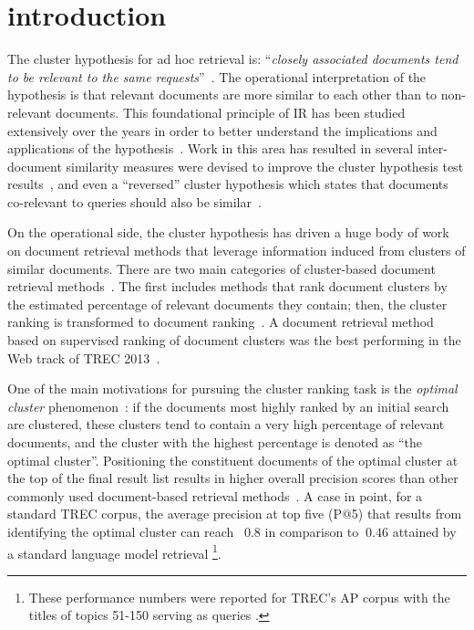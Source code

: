 \section{introduction}
\label{sec:intro}

The cluster hypothesis for ad hoc retrieval is: ``{\em closely
associated documents tend to be relevant to the same
requests}''~{\cite{Jardine+Rijsbergen:71a}}.
The operational interpretation of the hypothesis is that relevant
documents are more similar to each other than to non-relevant
documents.
This foundational principle of IR has been studied extensively over
the years in order to better understand the implications and
applications of the
hypothesis~{\cite{Jardine+Rijsbergen:71a,Voorhees:85a,elHamdouchi+Willett:87a,Crestani+Wu:06a,Smucker+Allan:09a,Raiber+Kurland:14c}}.
Work in this area has resulted in several inter-document similarity
measures were devised to improve the cluster hypothesis test
results~\cite{Tombros+Villa+Rijsbergen:02a,Raiber+al:15a}, and even a
``reversed'' cluster hypothesis which states that documents
co-relevant to queries should also be similar~\cite{Fuhr+al:12a}.

On the operational side, the cluster hypothesis has driven a huge
body of work on document retrieval methods that leverage information
induced from clusters of similar documents.
There are two main categories of cluster-based document retrieval
methods~\cite{Kurland+Lee:04a}.
The first includes methods that rank document clusters by the
estimated percentage of relevant documents they contain; then, the
cluster ranking is transformed to document
ranking~\cite{Jardine+Rijsbergen:71a,Croft:80a,Voorhees:85a,elHamdouchi+Willett:89a,Tombros+Villa+Rijsbergen:02a,Kurland+Lee:04a,Liu+Croft:04a,Kurland+Lee:06a,Liu+Croft:06a,Liu+Croft:06b,Liu+Croft:08a,Kurland+Domshlak:08a,Kurland+Krikon:11a,Raiber+Kurland:13a}.
A document retrieval method based on supervised ranking of document
clusters was the best performing in the Web track of TREC
2013~\cite{Thompson+al:13a}.

One of the main motivations for pursuing the cluster ranking task is
the {\em optimal cluster}
phenomenon~\cite{Cutting+al:92a,Tombros+Villa+Rijsbergen:02a,Liu+Croft:06b,Kurland+Domshlak:08a}:
if the documents most highly ranked by an initial search are
clustered, these clusters tend to contain a very high percentage of
relevant documents, and the cluster with the highest percentage is
denoted as ``the optimal cluster''.
Positioning the constituent documents of the optimal cluster at the
top of the final result list results in higher overall precision
scores than other commonly used document-based retrieval
methods~\cite{Tombros+Villa+Rijsbergen:02a,Liu+Croft:06b,Kurland+Domshlak:08a}.
A case in point, for a standard TREC corpus, the average precision at
top five (P@5) that results from identifying the optimal
cluster can reach ~$0.8$ in comparison to $~0.46$ attained by a
standard language model retrieval
\cite{Kurland+Domshlak:08a}\footnote{These performance numbers were
reported for TREC's AP corpus with the titles of topics 51-150
serving as queries \cite{Kurland+Domshlak:08a}.}.

